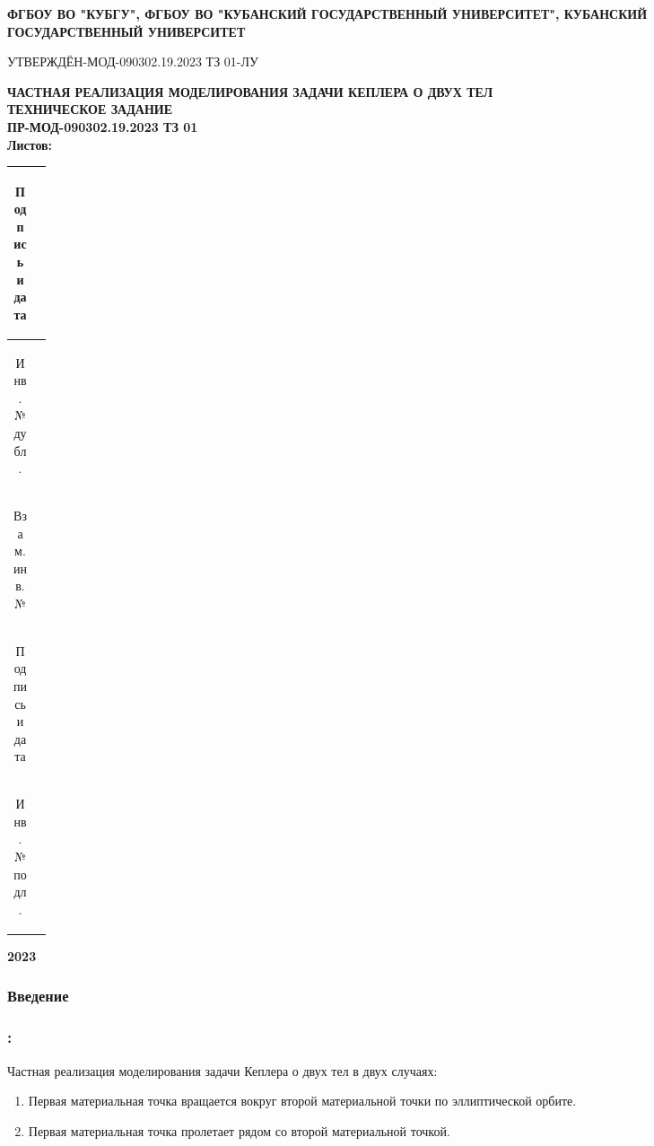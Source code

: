 


 \thispagestyle{empty}
 \begin{center}
 \large{\textbf{ФГБОУ ВО "КУБГУ", ФГБОУ ВО "КУБАНСКИЙ ГОСУДАРСТВЕННЫЙ УНИВЕРСИТЕТ", КУБАНСКИЙ ГОСУДАРСТВЕННЫЙ УНИВЕРСИТЕТ}}\\[3ex]
 \end{center}
 УТВЕРЖДЁН-МОД-090302.19.2023 ТЗ 01-ЛУ\newline
 \begin{center}
  \large{\textbf{ЧАСТНАЯ РЕАЛИЗАЦИЯ МОДЕЛИРОВАНИЯ ЗАДАЧИ КЕПЛЕРА О ДВУХ ТЕЛ}}
  \\[3ex]
  \large{\textbf{ТЕХНИЧЕСКОЕ ЗАДАНИЕ\\ПР-МОД-090302.19.2023 ТЗ 01\\Листов: \pageref{lastpage}}}
 \end{center}
 \begin{table}[!h]
  \begin{tabular}{|c|p{0.05\linewidth}|} \hline
   \begin{sideways}Подпись и дата\end{sideways} & \\ \hline
   \begin{sideways}Инв.№ дубл.\end{sideways} & \\ \hline
   \begin{sideways}Взам.инв.№\end{sideways} & \\ \hline
   \begin{sideways}Подпись и дата\end{sideways} & \\ \hline
   \begin{sideways}Инв.№подл.\end{sideways} & \\ \hline
  \end{tabular}
 \end{table}
 \hfill \break
 \begin{center}
  \large{\textbf{2023}}
 \end{center}

 \begin{center}\subsubsection*{Введение}\end{center}

 \subsubsection*{:}
 Частная реализация моделирования задачи Кеплера о двух тел в двух случаях:
 \begin{enumerate}
  \item Первая материальная точка вращается вокруг второй материальной точки по эллиптической орбите.
  \item Первая материальная точка пролетает рядом со второй материальной точкой.
 \end{enumerate}

